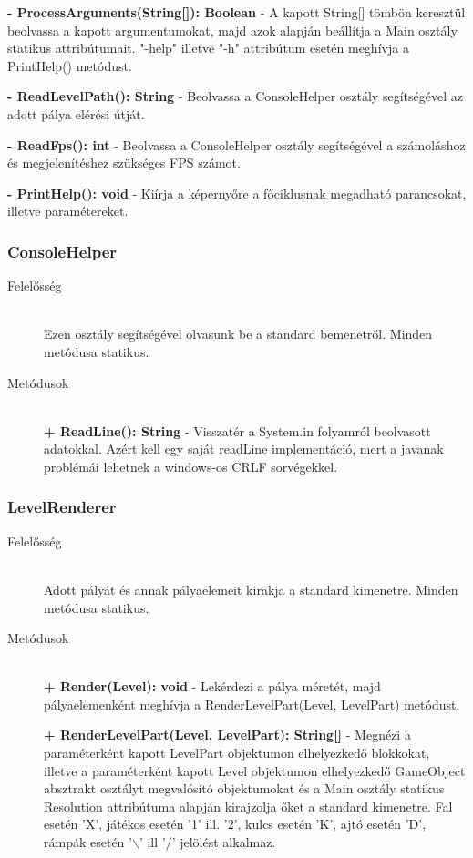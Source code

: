 \begin{description}
		\textbf{- ProcessArguments(String[]): Boolean} - A kapott String[] tömbön keresztül beolvassa a kapott argumentumokat, majd azok alapján beállítja a Main osztály statikus attribútumait. "-help" illetve "-h" attribútum esetén meghívja a PrintHelp() metódust.

		\textbf{- ReadLevelPath(): String} - Beolvassa a ConsoleHelper osztály segítségével az adott pálya elérési útját.

		\textbf{- ReadFps(): int} - Beolvassa a ConsoleHelper osztály segítségével a számoláshoz és megjelenítéshez szükséges FPS számot.

		\textbf{- PrintHelp(): void} - Kiírja a képernyőre a főciklusnak megadható parancsokat, illetve paramétereket.
	
	\end{description}
	
\subsubsection{ConsoleHelper}
	\begin{description}
		\item[Felelősség] \hfill \\
		Ezen osztály segítségével olvasunk be a standard bemenetről. Minden metódusa statikus.

		\item[Metódusok] \hfill \\
		\textbf{+ ReadLine(): String} - Visszatér a System.in folyamról beolvasott adatokkal. Azért kell egy saját readLine implementáció, mert a javanak problémái lehetnek a windows-os CRLF sorvégekkel.

	\end{description}
	
\subsubsection{LevelRenderer}
	\begin{description}
		\item[Felelősség] \hfill \\
		Adott pályát és annak pályaelemeit kirakja a standard kimenetre. Minden metódusa statikus.

		\item[Metódusok] \hfill \\
		\textbf{+ Render(Level): void} - Lekérdezi a pálya méretét, majd pályaelemenként meghívja a RenderLevelPart(Level, LevelPart) metódust.

		\textbf{+ RenderLevelPart(Level, LevelPart): String[]} - Megnézi a paraméterként kapott LevelPart objektumon elhelyezkedő blokkokat, illetve a paraméterként kapott Level objektumon elhelyezkedő GameObject absztrakt osztályt megvalósító objektumokat és a Main osztály statikus Resolution attribútuma alapján kirajzolja őket a standard kimenetre. Fal esetén 'X', játékos esetén '1' ill. '2', kulcs esetén 'K', ajtó esetén 'D', rámpák esetén '$\backslash$' ill '/' jelölést alkalmaz.

	\end{description}
	
